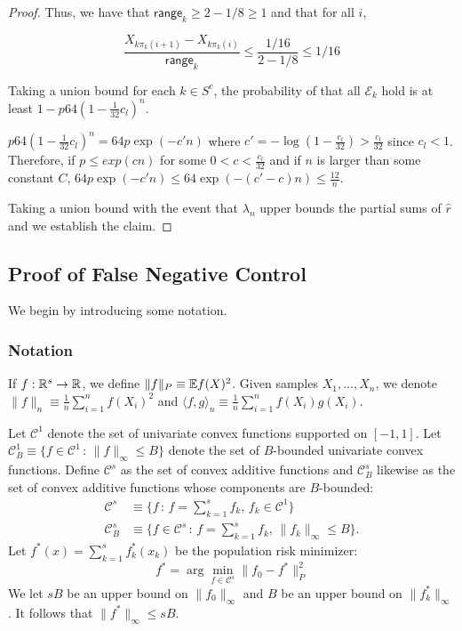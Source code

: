 \begin{proof}
Thus, we have that $\mathsf{range}_k \geq 2 - 1/8 \geq 1$ and that for all $i$,

\[
\frac{X_{k\pi_k(i+1)} - X_{k \pi_k(i)}}{\mathsf{range}_k} \leq 
\frac{ 1/16 }{ 2 - 1/8} \leq 1/16
\]

Taking a union bound for each $k \in S^c$, the probability of that all $\mathcal{E}_k$ hold is at least $1 - p 64 \left( 1 - \frac{1}{32} c_l \right)^n$.

$p64 \left( 1 - \frac{1}{32} c_l \right)^n = 64 p \exp( - c' n)$ where $c' = -\log(1-\frac{c_l}{32}) > \frac{c_l}{32}$ since $c_l < 1$. Therefore, if $p \leq exp( c n)$ for some $0<c < \frac{c_l}{32}$ and if $n$ is larger than some constant $C$, $64 p \exp( - c' n) \leq 64 \exp( - (c' - c) n) \leq \frac{12}{n}$.

Taking a union bound with the event that $\lambda_n$ upper bounds the partial sums of $\hat{r}$ and we establish the claim. 

\end{proof}


  
 
 \subsection{Proof of False Negative Control}
 \label{sec:false_negative_proof}
 We begin by introducing some notation.
 \subsubsection{Notation} 
\label{sec:false_negative_proof_notations}
If $f : \mathbb{R}^s \rightarrow {\mathbb R}$, we define $\| f \|_P \equiv {\mathbb E} f(X)^2$. 
Given samples $X_1,...,X_n$, we denote $\| f \|_n \equiv \frac{1}{n} \sum_{i=1}^n f(X_i)^2$ and $\langle f, g \rangle_n \equiv \frac{1}{n} \sum_{i=1}^n f(X_i) g(X_i)$. 

Let $\mathcal{C}^1$ denote the set of univariate convex functions supported on $[-1,1]$. Let $\mathcal{C}^1_B \equiv \{ f \in \mathcal{C}^1 \,:\, \| f \|_\infty \leq B \}$ denote the set of $B$-bounded univariate convex functions. 
Define $\mathcal{C}^s$ as the set of convex additive functions and
$\mathcal{C}^s_B$ likewise as the set of convex additive functions
whose components are $B$-bounded:
\begin{align*}
\mathcal{C}^s &\equiv \{ f \,:\, f = \sum_{k=1}^s f_k, \,
   f_k \in \mathcal{C}^1 \} \\
\mathcal{C}^s_B &\equiv \{ f \in \mathcal{C}^s \,:\, 
f = \sum_{k=1}^s f_k, \, \| f_k \|_\infty \leq B \}.
\end{align*}
Let $f^*(x) = \sum_{k=1}^s f^*_k(x_k)$ be the population risk minimizer:
\[
f^* = \arg\min_{f \in \mathcal{C}^s} \| f_0 - f^* \|_P^2
\]
We let $sB$ be an upper bound on $\| f_0 \|_\infty$ and $B$ be an
upper bound on $\| f^*_k \|_\infty$. 
It follows that $\|f^* \|_\infty \leq s B$.


